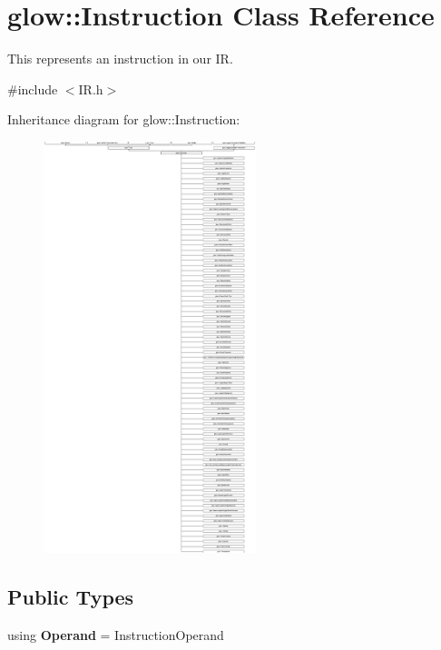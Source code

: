 \hypertarget{classglow_1_1_instruction}{}\section{glow\+:\+:Instruction Class Reference}
\label{classglow_1_1_instruction}


This represents an instruction in our IR.  




{\ttfamily \#include $<$I\+R.\+h$>$}

Inheritance diagram for glow\+:\+:Instruction\+:\begin{figure}[H]
\begin{center}
\leavevmode
\includegraphics[height=12.000000cm]{classglow_1_1_instruction}
\end{center}
\end{figure}
\subsection*{Public Types}
\begin{DoxyCompactItemize}
\item 
\mbox{\label{classglow_1_1_instruction_a69db88fac728c82be93f65a360e85459}} 
using {\bfseries Operand} = Instruction\+Operand
\end{DoxyCompactItemize}

